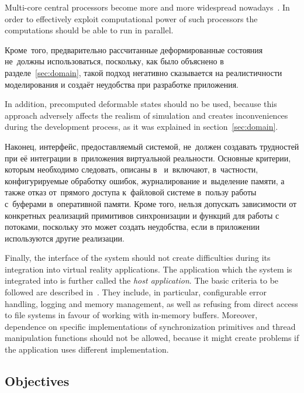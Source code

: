 \documentclass[a4paper, 12pt, titlepage]{extarticle}
\begin{document}
    Multi-core central processors become more and more widespread nowadays~\cite{steam-hardware}. In
    order to effectively exploit computational power of such processors the computations should be
    able to run in parallel.

\begin{original}
    Кроме~того, предварительно рассчитанные деформированные состояния не~должны использоваться,
    поскольку, как было объяснено в разделе~\ref{sec:domain}, такой подход негативно сказывается на реалистичности
    моделирования и создаёт неудобства при разработке приложения.
\end{original}

    In addition, precomputed deformable states should no be used, because this approach adversely
    affects the realism of simulation and creates inconveniences during the development process, as
    it was explained in section~\ref{sec:domain}.

\begin{original}
    Наконец, интерфейс, предоставляемый системой, не~должен создавать трудностей при её интеграции
    в~приложения виртуальной реальности. Основные критерии, которым необходимо следовать,
    описаны в~\cite{gems-middleware} и~включают, в~частности, конфигурируемые обработку ошибок,
    журналирование и~выделение памяти, а также отказ от~прямого доступа к~файловой системе в~пользу
    работы с~буферами в~оперативной памяти. Кроме того, нельзя допускать зависимости от конкретных
    реализаций примитивов синхронизации и функций для работы с потоками, поскольку это может создать
    неудобства, если в приложении используются другие реализации.
\end{original}

    Finally, the interface of the system should not create difficulties during its integration into
    virtual reality applications. The application which the system is integrated into is further called
    the \emph{host application}. The basic criteria to be followed are described in~\cite{gems-middleware}.
    They include, in particular, configurable error handling, logging and memory management, as well
    as refusing from direct access to file systems in favour of working with in-memory buffers.
    Moreover, dependence on specific implementations of synchronization primitives and thread
    manipulation functions should not be allowed, because it might create problems if the
    application uses different implementation.

    \subsection{Objectives}
\end{document}
